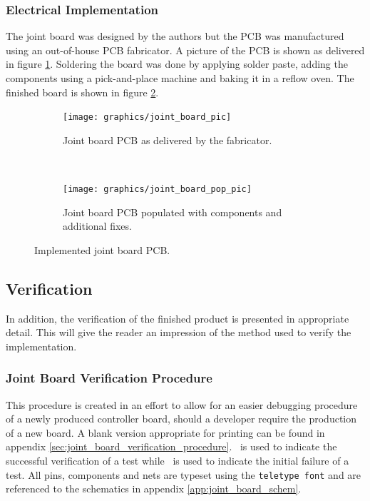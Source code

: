 \subsubsection{Electrical Implementation} %
\label{sub:electrical_implementation}
The joint board was designed by the authors but the PCB was manufactured using an out-of-house PCB fabricator. 
A picture of the PCB is shown as delivered in figure \ref{sfig:joint_board_pic}.
Soldering the board was done by applying solder paste, adding the components using a pick-and-place machine and baking it in a reflow oven.
The finished board is shown in figure \ref{sfig:joint_board_pop_pic}.
\begin{figure}
	\centering
	\begin{subfigure}[t]{0.40\textwidth}
		\centering
		\texttt{[image: graphics/joint\_board\_pic]}
		\caption{Joint board PCB as delivered by the fabricator.}
		\label{sfig:joint_board_pic}
	\end{subfigure}
	~
	\begin{subfigure}[t]{0.40\textwidth} 
		\centering
		\texttt{[image: graphics/joint\_board\_pop\_pic]}
		\caption[Joint board PCB populated with components]{Joint board PCB populated with components and additional fixes.}
		\label{sfig:joint_board_pop_pic}
	\end{subfigure}
	\caption{Implemented joint board PCB.}
	\label{fig:joint_board_pic_full}
\end{figure}


\subsection{Verification}
\label{sub:verification_joint_board_}
In addition, the verification of the finished product is presented in appropriate detail.
This will give the reader an impression of the method used to verify the implementation.

\subsubsection{Joint Board Verification Procedure} %
\label{ssub:joint_board_verification_methodology}
This procedure is created in an effort to allow for an easier debugging procedure of a newly produced controller board, should a developer require the production of a new board.
A blank version appropriate for printing can be found in appendix \ref{sec:joint_board_verification_procedure}.
\cmark ~is used to indicate the successful verification of a test while \xmark ~is used to indicate the initial failure of a test.
All pins, components and nets are typeset using the \texttt{teletype font} and are referenced to the schematics in appendix \ref{app:joint_board_schem}.
